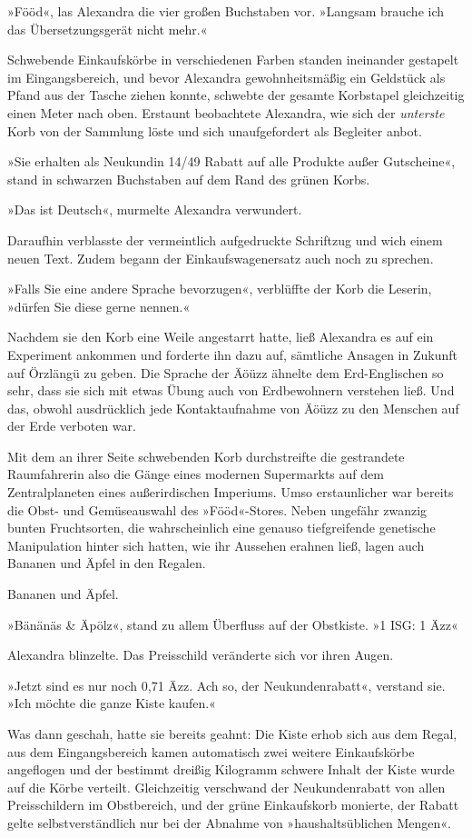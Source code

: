 »Fööd«, las Alexandra die vier großen Buchstaben vor. »Langsam brauche ich das Übersetzungsgerät nicht mehr.«

Schwebende Einkaufskörbe in verschiedenen Farben standen ineinander gestapelt im Eingangsbereich, und bevor Alexandra gewohnheitsmäßig ein Geldstück als Pfand aus der Tasche ziehen konnte, schwebte der gesamte Korbstapel gleichzeitig einen Meter nach oben. Erstaunt beobachtete Alexandra, wie sich der \textit{unterste} Korb von der Sammlung löste und sich unaufgefordert als Begleiter anbot.

»Sie erhalten als Neukundin 14/49 Rabatt auf alle Produkte außer Gutscheine«, stand in schwarzen Buchstaben auf dem Rand des grünen Korbs.

»Das ist Deutsch«, murmelte Alexandra verwundert.

Daraufhin verblasste der vermeintlich aufgedruckte Schriftzug und wich einem neuen Text. Zudem begann der Einkaufswagenersatz auch noch zu sprechen.

»Falls Sie eine andere Sprache bevorzugen«, verblüffte der Korb die Leserin, »dürfen Sie diese gerne nennen.«

Nachdem sie den Korb eine Weile angestarrt hatte, ließ Alexandra es auf ein Experiment ankommen und forderte ihn dazu auf, sämtliche Ansagen in Zukunft auf Örzlängü zu geben. Die Sprache der Äöüzz ähnelte dem Erd-Englischen so sehr, dass sie sich mit etwas Übung auch von Erdbewohnern verstehen ließ. Und das, obwohl ausdrücklich jede Kontaktaufnahme von Äöüzz zu den Menschen auf der Erde verboten war.

Mit dem an ihrer Seite schwebenden Korb durchstreifte die gestrandete Raumfahrerin also die Gänge eines modernen Supermarkts auf dem Zentralplaneten eines außerirdischen Imperiums. Umso erstaunlicher war bereits die Obst- und Gemüseauswahl des »Fööd«-Stores. Neben ungefähr zwanzig bunten Fruchtsorten, die wahrscheinlich eine genauso tiefgreifende genetische Manipulation hinter sich hatten, wie ihr Aussehen erahnen ließ, lagen auch Bananen und Äpfel in den Regalen.

Bananen und Äpfel.

»Bänänäs \& Äpölz«, stand zu allem Überfluss auf der Obstkiste. »1 ISG: 1 Äzz«

Alexandra blinzelte. Das Preisschild veränderte sich vor ihren Augen.

»Jetzt sind es nur noch 0,71 Äzz. Ach so, der Neukundenrabatt«, verstand sie. »Ich möchte die ganze Kiste kaufen.«

Was dann geschah, hatte sie bereits geahnt: Die Kiste erhob sich aus dem Regal, aus dem Eingangsbereich kamen automatisch zwei weitere Einkaufskörbe angeflogen und der bestimmt dreißig Kilogramm schwere Inhalt der Kiste wurde auf die Körbe verteilt. Gleichzeitig verschwand der Neukundenrabatt von allen Preisschildern im Obstbereich, und der grüne Einkaufskorb monierte, der Rabatt gelte selbstverständlich nur bei der Abnahme von »haushaltsüblichen Mengen«.

